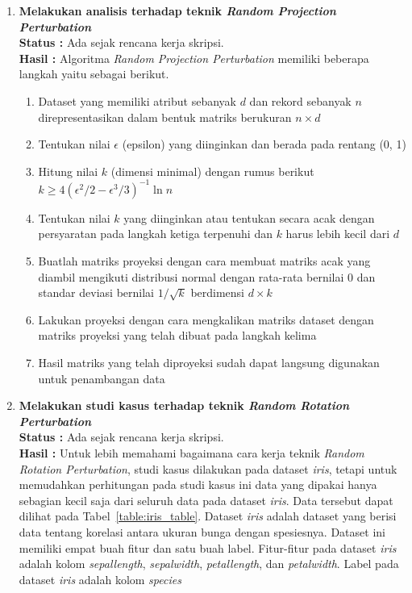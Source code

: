 \documentclass[a4paper,twoside]{article}
\begin{document}
\begin{enumerate}
		\item \textbf{Melakukan analisis terhadap teknik \textit{Random Projection Perturbation}}\\
		{\bf Status :} Ada sejak rencana kerja skripsi.\\
		{\bf Hasil :} Algoritma \textit{Random Projection Perturbation} memiliki beberapa langkah yaitu sebagai berikut.
		\begin{enumerate}
			\item Dataset yang memiliki atribut sebanyak \(d\) dan rekord sebanyak \(n\) direpresentasikan dalam bentuk matriks berukuran \(n \times d\)
			\item Tentukan nilai \(\epsilon\) (epsilon) yang diinginkan dan berada pada rentang (0, 1)
			\item Hitung nilai \(k\) (dimensi minimal) dengan rumus berikut \(k \geq 4(\epsilon^{2}/2-\epsilon^{3}/3)^{-1}\ln{n}\)
			\item Tentukan nilai \(k\) yang diinginkan atau tentukan secara acak dengan persyaratan pada langkah ketiga terpenuhi dan \(k\) harus lebih kecil dari \(d\)
			\item Buatlah matriks proyeksi dengan cara membuat matriks acak yang diambil mengikuti distribusi normal dengan rata-rata bernilai 0 dan standar deviasi bernilai \(1/\sqrt{k}\) berdimensi \(d \times k\)
			\item Lakukan proyeksi dengan cara mengkalikan matriks dataset dengan matriks proyeksi yang telah dibuat pada langkah kelima
			\item Hasil matriks yang telah diproyeksi sudah dapat langsung digunakan untuk penambangan data
		\end{enumerate}

		\item \textbf{Melakukan studi kasus terhadap teknik \textit{Random Rotation Perturbation}}\\
		{\bf Status :} Ada sejak rencana kerja skripsi.\\
		{\bf Hasil :} Untuk lebih memahami bagaimana cara kerja teknik \textit{Random Rotation Perturbation}, studi kasus dilakukan pada dataset \textit{iris}, tetapi untuk memudahkan perhitungan pada studi kasus ini data yang dipakai hanya sebagian kecil saja dari seluruh data pada dataset \textit{iris}. Data tersebut dapat dilihat pada Tabel~\ref{table:iris_table}. Dataset \textit{iris} adalah dataset yang berisi data tentang korelasi antara ukuran bunga dengan spesiesnya. Dataset ini memiliki empat buah fitur dan satu buah label. Fitur-fitur pada dataset \textit{iris} adalah kolom \textit{sepal\textunderscore length}, \textit{sepal\textunderscore width}, \textit{petal\textunderscore length}, dan \textit{petal\textunderscore width}. Label pada dataset \textit{iris} adalah kolom \textit{species}


\end{enumerate}
\end{document}
